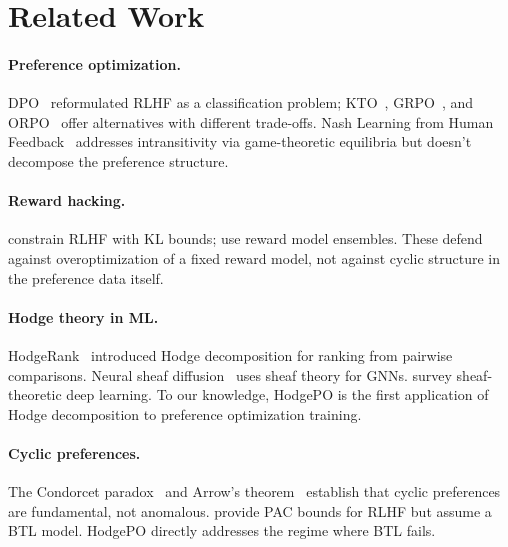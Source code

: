 \documentclass{article}
\begin{document}
\section{Related Work}
\label{sec:related}

\paragraph{Preference optimization.} DPO~\citep{rafailov2023direct} reformulated RLHF as a classification problem; KTO~\citep{ethayarajh2024kto}, GRPO~\citep{shao2024deepseekmath}, and ORPO~\citep{hong2024orpo} offer alternatives with different trade-offs. Nash Learning from Human Feedback~\citep{munos2023nash} addresses intransitivity via game-theoretic equilibria but doesn't decompose the preference structure.

\paragraph{Reward hacking.} \citet{moskovitz2024confronting} constrain RLHF with KL bounds; \citet{coste2024reward} use reward model ensembles. These defend against overoptimization of a fixed reward model, not against cyclic structure in the preference data itself.

\paragraph{Hodge theory in ML.} HodgeRank~\citep{jiang2011statistical} introduced Hodge decomposition for ranking from pairwise comparisons. Neural sheaf diffusion~\citep{bodnar2022neural} uses sheaf theory for GNNs. \citet{ayzenberg2025sheaf} survey sheaf-theoretic deep learning. To our knowledge, HodgePO is the first application of Hodge decomposition to preference optimization training.

\paragraph{Cyclic preferences.} The Condorcet paradox~\citep{condorcet1785essai} and Arrow's theorem~\citep{arrow1950difficulty} establish that cyclic preferences are fundamental, not anomalous. \citet{zhu2023principled} provide PAC bounds for RLHF but assume a BTL model. HodgePO directly addresses the regime where BTL fails.

\end{document}
